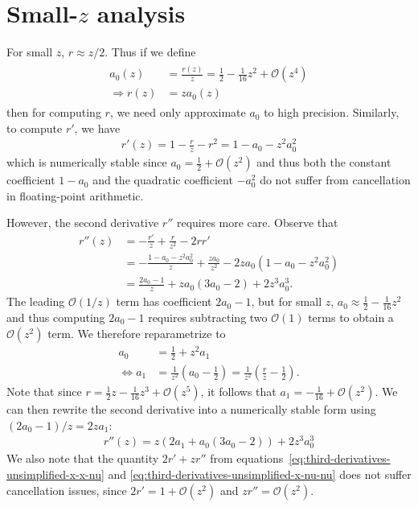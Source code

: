 \documentclass{article}
\begin{document}
\section{Small-$z$ analysis}

For small $z$, $r \approx z/2$.
Thus if we define
%
\begin{align}
  \boxed{
    \begin{aligned}
      a_0(z)           & = \frac{r(z)}{z} = \frac{1}{2} - \frac{1}{16}z^2 + \mathcal{O}(z^4) \\
      \Rightarrow r(z) & = z a_0(z)
    \end{aligned}
  }
\end{align}
%
then for computing $r$, we need only approximate $a_0$ to high precision.
Similarly, to compute $r'$, we have
%
\begin{align}\label{eq:r-prime-reparametrized}
  \boxed{r'(z) = 1 - \frac{r}{z} - r^2 = 1 - a_0 - z^2 a_0^2}
\end{align}
%
which is numerically stable since $a_0 = \frac{1}{2} + \mathcal{O}(z^2)$ and thus both the constant coefficient $1 - a_0$ and the quadratic coefficient $-a_0^2$ do not suffer from cancellation in floating-point arithmetic.

However, the second derivative $r''$ requires more care.
Observe that
%
\begin{align}
  r''(z) & = -\frac{r'}{z} + \frac{r}{z^2} - 2 r r'                                             \\
         & = -\frac{1 - a_0 - z^2 a_0^2}{z} + \frac{z a_0}{z^2} -  2 z a_0(1 - a_0 - z^2 a_0^2) \\
         & = \frac{2 a_0 - 1}{z} + z a_0 (3 a_0 - 2) + 2 z^3 a_0^3.
\end{align}
%
The leading $\mathcal{O}(1/z)$ term has coefficient $2a_0 - 1$, but for small $z$, $a_0 \approx \frac{1}{2} - \frac{1}{16}z^2$ and thus computing $2a_0 - 1$ requires subtracting two $\mathcal{O}(1)$ terms to obtain a $\mathcal{O}(z^2)$ term.
We therefore reparametrize to
%
\begin{align}
  a_0                 & = \frac{1}{2} + z^2 a_1 \label{eq:a0-reparametrized}                                                          \\
  \Leftrightarrow a_1 & = \frac{1}{z^2} (a_0 - \frac{1}{2}) = \frac{1}{z^2} (\frac{r}{z} - \frac{1}{2}). \label{eq:a1-reparametrized}
\end{align}
%
Note that since $r = \frac{1}{2}z - \frac{1}{16}z^3 + \mathcal{O}(z^5)$, it follows that $a_1 = -\frac{1}{16} + \mathcal{O}(z^2)$.
We can then rewrite the second derivative into a numerically stable form using $(2 a_0 - 1) / z = 2 z a_1$:
%
\begin{align}
  \boxed{r''(z) = z (2a_1 + a_0 (3 a_0 - 2)) + 2 z^3 a_0^3} \label{eq:r-second-derivative-reparametrized}
\end{align}
%
We also note that the quantity $2r' + z r''$ from equations~\eqref{eq:third-derivatives-unsimplified-x-x-nu} and
\eqref{eq:third-derivatives-unsimplified-x-nu-nu} does not suffer cancellation issues, since $2r' = 1 + \mathcal{O}(z^2)$ and $z r'' = \mathcal{O}(z^2)$.
\end{document}
